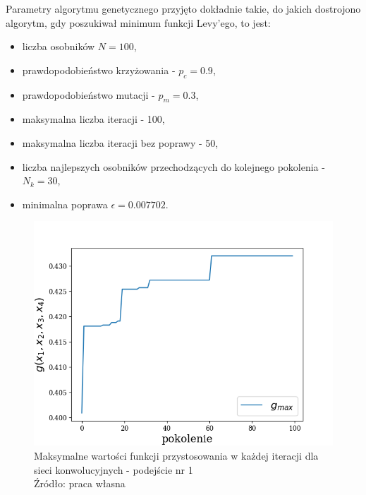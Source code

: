 Parametry algorytmu genetycznego przyjęto dokładnie takie, do jakich dostrojono algorytm, gdy poszukiwał minimum funkcji Levy'ego, to jest:
\begin{itemize}
  \item liczba osobników $N = 100$,
  \item prawdopodobieństwo krzyżowania - $p_{c} = 0.9$,
  \item prawdopodobieństwo mutacji - $p_{m} = 0.3$,
  \item maksymalna liczba iteracji - 100,
  \item maksymalna liczba iteracji bez poprawy - 50,
  \item liczba najlepszych osobników przechodzących do kolejnego pokolenia - $ N_{k} = 30$,
  \item minimalna poprawa $\epsilon = 0.007702$.
\end{itemize}

\begin{figure}[h!tb]
	 \centering
	 \includegraphics[width = 0.9\linewidth]{img/cnn_maxes_first}
	 \caption{Maksymalne wartości funkcji przystosowania w każdej iteracji dla sieci konwolucyjnych - podejście nr 1\\
              Źródło: praca własna}
	 \label{fig:cnn_maxes_first}
\end{figure}

